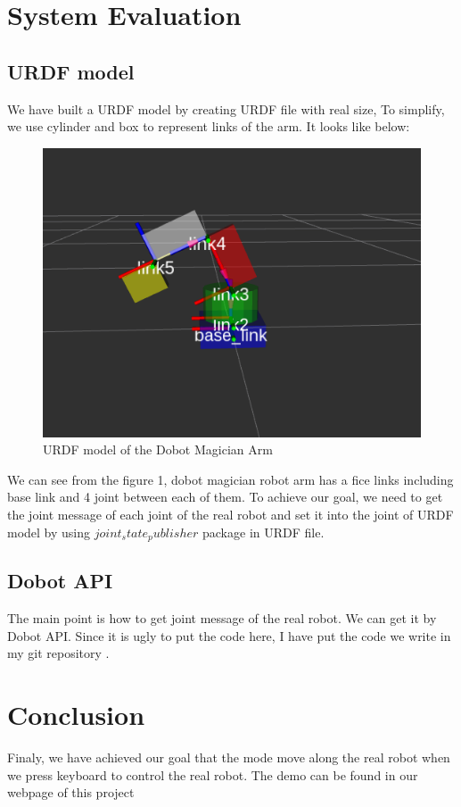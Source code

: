 \documentclass[10pt,twocolumn,letterpaper]{article}
\begin{document}
\section{System	Evaluation}

\subsection{URDF model}

We have built a URDF model by creating URDF file with real size, To simplify, we use cylinder and box to represent links of the arm. It looks like below:

\begin{figure}[t]
\begin{center}
	\includegraphics[width=0.8\linewidth]{urdf_model.png}
\end{center}
   \caption{URDF model of the Dobot Magician Arm}
\label{fig:long}
\label{fig:onecol}
\end{figure}

We can see from the figure 1, dobot magician robot arm has a fice links including base link and 4 joint between each of them. To achieve our goal, we need to get the joint message of each joint of the real robot and set it into the joint of URDF model by using $ joint_state_publisher $ package in URDF file.

\subsection{Dobot API}

The main point is how to get joint message of the real robot. We can get it by Dobot API. Since it is ugly to put the code here, I have put the code we write in my git repository \cite{}.

\section{Conclusion}

Finaly, we have achieved our goal that the mode move along the real robot when we press keyboard to control the real robot. The demo can be found in our webpage of this project \cite{}


{


}
\end{document}
